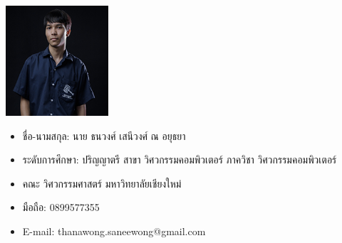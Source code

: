 \documentclass[semifinal]{cpecmu}
\author{นายกฤษฏิ์ อุปนันท์}{Krit Upanun}{600610717}
\author{นายธนวงศ์ เสนีวงศ์ ณ อยุธยา}{Thanawong Saneewong Na Ayutthaya}{600610738}
\begin{document}


\pagestyle{empty}\cleardoublepage
\normalspacing \setcounter{page}{1}  \pagestyle{cpecmu}





\ifproject

\fi



\ifproject
\appendix


\ifglossary\glossarypage\fi

\ifindex\indexpage\fi

\begin{biosketch}
\begin{center}
  \includegraphics[width=1.5in]{./images/tom_pic_resize.png}
\end{center}
\begin{itemize}[label={},leftmargin=*]
  \item ชื่อ-นามสกุล: นาย ธนวงศ์ เสนีวงศ์ ณ อยุธยา
  \item ระดับการศึกษา: ปริญญาตรี สาขา วิศวกรรมคอมพิวเตอร์ ภาควิชา วิศวกรรมคอมพิวเตอร์
  \item คณะ วิศวกรรมศาสตร์ มหาวิทยาลัยเชียงใหม่
  \item มือถือ: 0899577355 
  \item E-mail: thanawong.saneewong@gmail.com
\end{itemize}



\end{biosketch}
\end{document}
